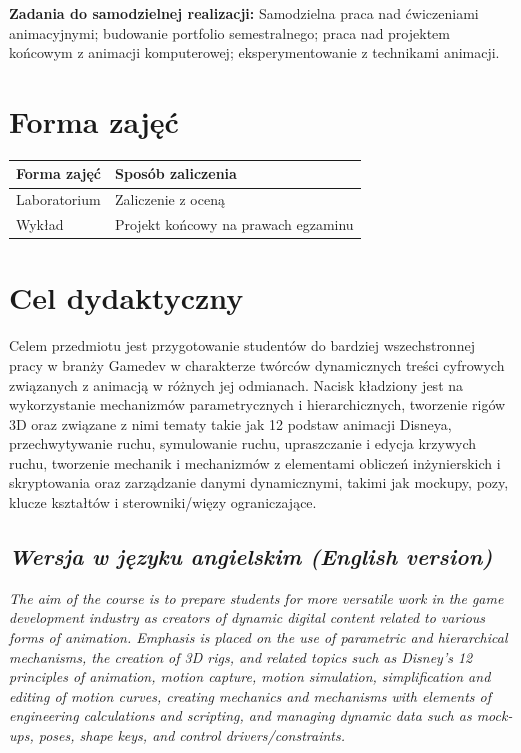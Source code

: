\documentclass[12pt, a4paper]{article}
\begin{document}
\vspace{4pt}
\noindent\textbf{Zadania do samodzielnej realizacji:} Samodzielna praca nad ćwiczeniami animacyjnymi; budowanie portfolio semestralnego; praca nad projektem końcowym z animacji komputerowej; eksperymentowanie z technikami animacji.

\section{Forma zajęć}

\begin{tabular}{ll}
  \hline
  \textbf{Forma zajęć} & \textbf{Sposób zaliczenia} \\
  \hline
  Laboratorium & Zaliczenie z oceną \\
  Wykład & Projekt końcowy na prawach egzaminu \\
  \hline
\end{tabular}

\section{Cel dydaktyczny}

Celem przedmiotu jest przygotowanie studentów do bardziej wszechstronnej pracy w branży Gamedev w charakterze twórców dynamicznych treści cyfrowych związanych z animacją w różnych jej odmianach. Nacisk kładziony jest na wykorzystanie mechanizmów parametrycznych i hierarchicznych, tworzenie rigów 3D oraz związane z nimi tematy takie jak 12 podstaw animacji Disneya, przechwytywanie ruchu, symulowanie ruchu, upraszczanie i edycja krzywych ruchu, tworzenie mechanik i mechanizmów z elementami obliczeń inżynierskich i skryptowania oraz zarządzanie danymi dynamicznymi, takimi jak mockupy, pozy, klucze kształtów i sterowniki/więzy ograniczające.

\subsection*{\textit{Wersja w języku angielskim (English version)}}

\textit{The aim of the course is to prepare students for more versatile work in the game development industry as creators of dynamic digital content related to various forms of animation. Emphasis is placed on the use of parametric and hierarchical mechanisms, the creation of 3D rigs, and related topics such as Disney’s 12 principles of animation, motion capture, motion simulation, simplification and editing of motion curves, creating mechanics and mechanisms with elements of engineering calculations and scripting, and managing dynamic data such as mock-ups, poses, shape keys, and control drivers/constraints.}
\end{document}

